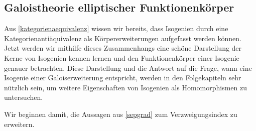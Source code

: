 \documentclass[english, german, parskip=half]{scrartcl}
\theoremstyle{definition}
\theoremstyle{remark}
\begin{document}

\subsection{Galoistheorie elliptischer Funktionenkörper}
Aus \autoref{kategorienaequivalenz} wissen wir bereits, dass Isogenien
durch eine Kategorienantiäquivalenz als Körpererweiterungen aufgefasst
werden können. 
Jetzt werden wir mithilfe dieses Zusammenhangs eine schöne Darstellung
der Kerne von Isogenien kennen lernen und den Funktionenkörper einer
Isogenie genauer betrachten.
Diese Darstellung und die Antwort auf die Frage, wann eine Isogenie einer
Galoiserweiterung entspricht, werden in den Folgekapiteln sehr
nützlich sein, um weitere Eigenschaften von Isogenien als
Homomorphismen zu untersuchen. 

Wir beginnen damit, die Aussagen aus \autoref{sepgrad} zum
Verzweigungsindex zu erweitern.
\end{document}
